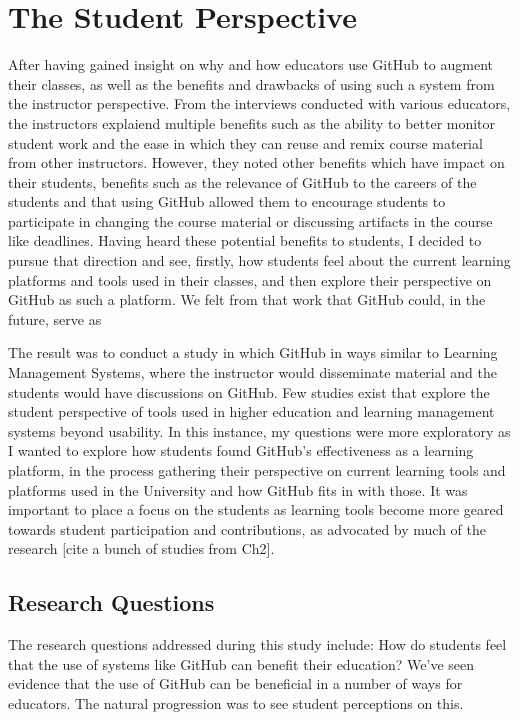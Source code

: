 \chapter{The Student Perspective}

After having gained insight on why and how educators use GitHub to augment their classes, as well as the benefits and drawbacks of using such a system from the instructor perspective. From the interviews conducted with various educators, the instructors explaiend multiple benefits such as the ability to better monitor student work and the ease in which they can reuse and remix course material from other instructors. However, they noted other benefits which have impact on their students, benefits such as the relevance of GitHub to the careers of the students and that using GitHub allowed them to encourage students to participate in changing the course material or discussing artifacts in the course like deadlines. Having heard these potential benefits to students, I decided to pursue that direction and see, firstly, how students feel about the current learning platforms and tools used in their classes, and then explore their perspective on GitHub as such a platform. We felt from that work that GitHub could, in the future, serve as

The result was to conduct a study in which GitHub in ways similar to Learning Management Systems, where the instructor would disseminate material and the students would have discussions on GitHub. Few studies exist that explore the student perspective of tools used in higher education and learning management systems beyond usability. In this instance, my questions were more exploratory as I wanted to explore how students found GitHub's effectiveness as a learning platform, in the process gathering their perspective on current learning tools and platforms used in the University and how GitHub fits in with those. It was important to place a focus on the students as learning tools become more geared towards student participation and contributions, as advocated by much of the research [cite a bunch of studies from Ch2].

\section{Research Questions}
The research questions addressed during this study include:
\bigskip
How do students feel that the use of systems like GitHub can benefit their education? We've seen evidence that the use of GitHub can be beneficial in a number of ways for educators. The natural progression was to see student perceptions on this.

